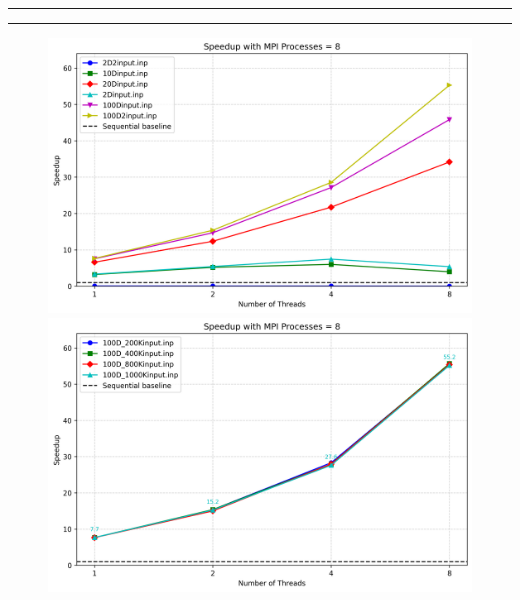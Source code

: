 \documentclass{article}
\begin{document}
  \begin{center}
    \rule{2.5cm}{1pt}  \rule{2.5cm}{1pt}
  \end{center}
  \begin{figure}[ht]
    \centering
    \begin{minipage}{0.4\textwidth}
      \centering
      \includegraphics[width=\linewidth]{../test_csv/plots/speedup/plot_omp_mpi_8_small_slurm.png}
    \end{minipage}
    \begin{minipage}{0.4\textwidth}
      \centering
      \includegraphics[width=\linewidth]{../test_csv/plots/speedup/plot_omp_mpi_8_big_slurm.png}
    \end{minipage}
    \begin{minipage}{0.4\textwidth}
      \centering

\end{minipage}
\end{figure}
\end{document}
